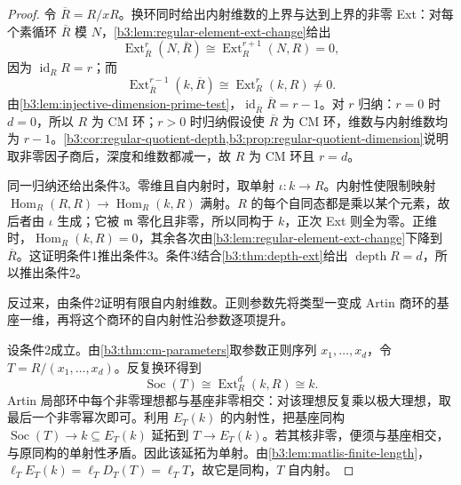 \begin{proof}
	令 \(\overline R=R/xR\)。换环同时给出内射维数的上界与达到上界的非零 Ext：对每个素循环 \(\overline R\) 模 \(N\)，\cref{b3:lem:regular-element-ext-change}给出
	\[
		\operatorname{Ext}_{\overline R}^{r}(N,\overline R) \cong\operatorname{Ext}_R^{r+1}(N,R)=0,
	\]
	因为 \(\operatorname{id}_RR=r\)；而
	\[
		\operatorname{Ext}_{\overline R}^{r-1}(k,\overline R) \cong\operatorname{Ext}_R^r(k,R)\ne0.
	\]
	由\cref{b3:lem:injective-dimension-prime-test}，\(\operatorname{id}_{\overline R}\overline R=r-1\)。对 \(r\) 归纳：\(r=0\) 时 \(d=0\)，所以 \(R\) 为 CM 环；\(r>0\) 时归纳假设使 \(\overline R\) 为 CM 环，维数与内射维数均为 \(r-1\)。\cref{b3:cor:regular-quotient-depth,b3:prop:regular-quotient-dimension}说明取非零因子商后，深度和维数都减一，故 \(R\) 为 CM 环且 \(r=d\)。

	同一归纳还给出条件3。零维且自内射时，取单射 \(\iota:k\rightarrow R\)。内射性使限制映射 \(\operatorname{Hom}_R(R,R)\rightarrow\operatorname{Hom}_R(k,R)\) 满射。\(R\) 的每个自同态都是乘以某个元素，故后者由 \(\iota\) 生成；它被 \(\mathfrak m\) 零化且非零，所以同构于 \(k\)，正次 Ext 则全为零。正维时，\(\operatorname{Hom}_R(k,R)=0\)，其余各次由\cref{b3:lem:regular-element-ext-change}下降到 \(\overline R\)。这证明条件1推出条件3。条件3结合\cref{b3:thm:depth-ext}给出 \(\operatorname{depth}R=d\)，所以推出条件2。

	反过来，由条件2证明有限自内射维数。正则参数先将类型一变成 Artin 商环的基座一维，再将这个商环的自内射性沿参数逐项提升。

	设条件2成立。由\cref{b3:thm:cm-parameters}取参数正则序列 \(x_1,\ldots,x_d\)，令 \(T=R/(x_1,\ldots,x_d)\)。反复换环得到
	\[
		\operatorname{Soc}(T)\cong\operatorname{Ext}_R^d(k,R)\cong k.
	\]
	Artin 局部环中每个非零理想都与基座非零相交：对该理想反复乘以极大理想，取最后一个非零幂次即可。利用 \(E_T(k)\) 的内射性，把基座同构 \(\operatorname{Soc}(T)\rightarrow k\subseteq E_T(k)\) 延拓到 \(T\rightarrow E_T(k)\)。若其核非零，便须与基座相交，与原同构的单射性矛盾。因此该延拓为单射。由\cref{b3:lem:matlis-finite-length}， \(\ell_T E_T(k)=\ell_T D_T(T)=\ell_T T\)，故它是同构，\(T\) 自内射。


\end{proof}
